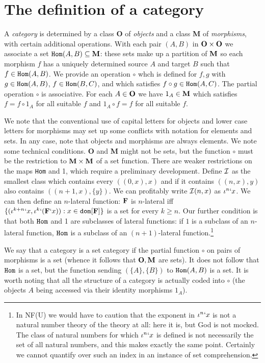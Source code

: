\documentclass[12pt]{article}
\begin{document}
\section{The definition of a category}

A {\em category\/} is determined by a class {\bf O} of {\em objects\/} and a class {\bf M} of {\em morphisms\/}, with certain additional operations.  With each pair $(A,B)$ in ${\bf O \times O}$ we associate a set ${\tt Hom}(A,B) \subseteq {\bf M}$:  these sets make up a partition of ${\bf M}$ so each morphism $f$ has a uniquely determined source $A$ and target $B$ such that $f \in {\tt Hom}(A,B)$.  We provide an operation $\circ$ whch is defined for $f,g$ with $g \in {\tt Hom}(A,B)$, $f \in {\tt Hom}(B,C)$, and which satisfies $f \circ g \in {\tt Hom}(A,C)$.
The partial operation $\circ$ is associative.  For each $A \in {\bf O}$ we have $1_A \in {\bf M}$ which satisfies $f = f \circ 1_A$ for all suitable $f$ and $1_A \circ f = f$ for all suitable $f$.

We note that the conventional use of capital letters for objects and lower case letters for morphisms may set up some conflicts with notation for elements and sets.  In any case, note that objects and morphisms are always elements.  We note some technical conditions.  {\bf O} and {\bf M} might not be sets, but the function $\circ$ must be the restriction to 
${\bf M} \times {\bf M}$ of a set function.  There are weaker restrictions on the maps {\tt Hom} and 1, which require a preliminary development.  Define $\cal I$ as the smallest class
which contains every $((0,x),x)$ and if it contains $((n,x),y)$ also contains $((n+1,x),\{y\})$.  We can profitably write ${\cal I}(n,x)$ as $\iota^n`x$.  We can then define an $n$-lateral function: ${\bf F}$ is $n$-lateral iff $\{(\iota^{k+n}`x,\iota^k`({\bf F}`x)):x \in {\tt dom}[{\bf F}]\}$ is a set for every $k \geq n$.  Our further condition is that both ${\tt Hom}$
and 1 are subclasses of lateral functions:  if $1$ is a subclass of an $n$-lateral function, ${\tt Hom}$ is a subclass of an $(n+1)$-lateral function.\footnote{In NF(U) we would have to caution that the exponent in $\iota^n`x$ is not a natural number theory of the theory at all: here it is, but God is not mocked.  The class of natural numbers for which $\iota^n`x$ is defined is not necessarily the set of all natural numbers, and this makes exactly the same point.  Certainly we cannot quantify over such an index in an instance of set comprehension.}

We say that a category is a set category  if the partial function $\circ$  on pairs of morphisms is a set (whence it follows that ${\bf O},{\bf M}$ are sets).  It does not follow
that ${\tt Hom}$ is a set, but the function sending $(\{A\},\{B\})$ to ${\tt Hom}(A,B)$ is a set.  It is worth noting that all the structure of a category is actually coded into $\circ$ (the objects $A$ being accessed via their identity morphisms $1_A$).
\end{document}
